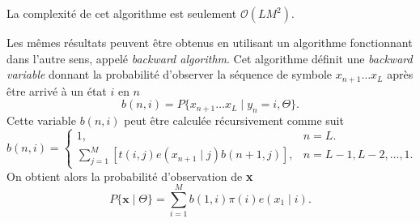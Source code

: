 \documentclass[a4paper, 11pt]{article}
\newcommand{\pinit}{\pi (i)}
\begin{document}
La complexité de cet algorithme est seulement $\mathcal{O}(LM^2)$.
\\
\par
Les mêmes résultats peuvent être obtenus en utilisant un algorithme fonctionnant dans l'autre sens, appelé \textit{backward algorithm}. Cet algorithme définit une \textit{backward variable} donnant la probabilité d'observer la séquence de symbole $x_{n+1}\dotsc x_L$ après être arrivé à un état $i$ en $n$
\begin{equation}
b(n,i)=P\{x_{n+1}\dotsc x_L\mid y_n=i,\Theta\}.
\end{equation}
Cette variable $b(n,i)$ peut être calculée récursivement comme suit
\begin{equation}
b(n,i) = \begin{cases}
	1, & n=L.\\
	\sum_{j=1}^{M}[t(i,j)e(x_{n+1}\mid j)b(n+1,j)], & n=L-1,L-2,\dotsc ,1.
\end{cases}
\end{equation}
On obtient alors la probabilité d'observation de \textbf{x} 
\begin{equation}
P\{\textbf{x}\mid\Theta\} = \sum_{i=1}^{M}b(1,i)\pinit e(x_1 \mid i).
\end{equation}
\end{document}
